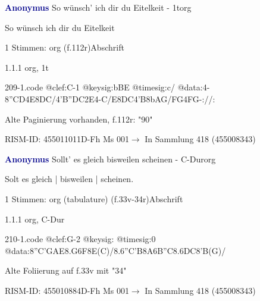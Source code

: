 \documentclass[twocolumn]{book}
\begin{document}
\par \vspace{7pt} \textcolor{darkblue}{\textbf{Anonymus  }}\hfillplus{\textbf{[209]}}\newline So wünsch' ich dir du Eitelkeit - 1t\newline org
\par \begin{itshape}[f.112r, heading:] So wünsch ich dir du Eitelkeit\end{itshape} 
\par \textcolor{darkblue}{}  1 Stimmen: org  (f.112r)\newline Abschrift
\par 1.1.1  org, 1t  
\begin{filecontents*}{209-1.code}
@clef:C-1
@keysig:bBE
@timesig:c/
@data:4-{8''CD}4E{8DC}/4'B''DC2E4-C/E{8DC}4'B{8bAG}/{FG}4FG-://:
\end{filecontents*}
\newline
%
\par Alte Paginierung vorhanden, f.112r: "90"
\par RISM-ID: 455011011\newline D-Fh  Ms 001\newline $\rightarrow$ In Sammlung 418 (455008343)
      
\par \vspace{7pt} \textcolor{darkblue}{\textbf{Anonymus  }}\hfillplus{\textbf{[210]}}\newline Sollt' es gleich bisweilen scheinen - C-Dur\newline org
\par \begin{itshape}[f.33v, at left:] Solt es gleich | bisweilen | scheinen.\end{itshape} 
\par \textcolor{darkblue}{}  1 Stimmen: org (tabulature)  (f.33v-34r)\newline Abschrift
\par 1.1.1  org, C-Dur  
\begin{filecontents*}{210-1.code}
@clef:G-2
@keysig:
@timesig:0
@data:{8''C'GAE}{8.G6F8E(C)}/{8.6''C'B8A6B''C}{8.6DC8'B(G)}/
\end{filecontents*}
\newline
%
\par Alte Foliierung auf f.33v mit "34"
\par RISM-ID: 455010884\newline D-Fh  Ms 001\newline $\rightarrow$ In Sammlung 418 (455008343)
      
\end{document}
